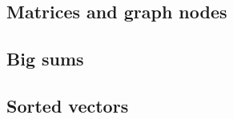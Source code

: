 \subsection{Matrices and graph nodes}
\label{subsect.matrices.and.graph.nodes}



\subsection{Big sums}
\label{subsect.sums}





\subsection{Sorted vectors}
\label{subsect.sorted.vectors}


